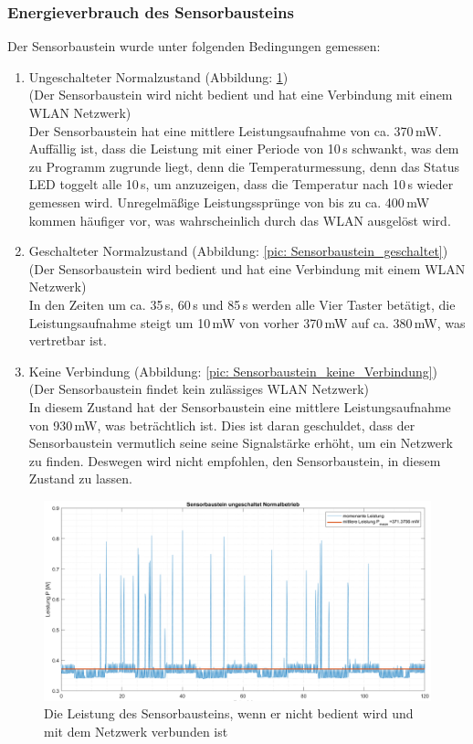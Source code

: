 \subsubsection{Energieverbrauch des Sensorbausteins}
Der Sensorbaustein wurde unter folgenden Bedingungen gemessen:
\begin{enumerate}
	\item Ungeschalteter Normalzustand (Abbildung: \ref{pic: Sensorbaustein_ungeschaltet}) \\(Der Sensorbaustein wird nicht bedient und hat eine Verbindung mit einem WLAN Netzwerk) \\
	Der Sensorbaustein hat eine mittlere Leistungsaufnahme von ca. 370\,mW. Auffällig ist, dass die Leistung mit einer Periode von 10\,s schwankt, was dem zu Programm zugrunde liegt, denn die Temperaturmessung, denn das Status LED toggelt alle 10\,s, um anzuzeigen, dass die Temperatur nach 10\,s wieder gemessen wird. Unregelmäßige Leistungssprünge von bis zu ca. 400\,mW kommen häufiger vor, was wahrscheinlich durch das WLAN ausgelöst wird.
	\\
	\item Geschalteter Normalzustand (Abbildung: \ref{pic: Sensorbaustein_geschaltet})\\ (Der Sensorbaustein wird bedient und hat eine Verbindung mit einem WLAN Netzwerk)\\
	In den Zeiten um ca. 35\,s, 60\,s und 85\,s werden alle Vier Taster betätigt, die Leistungsaufnahme steigt um 10\,mW von vorher 370\,mW auf ca. 380\,mW, was vertretbar ist.
	\\
	\item Keine Verbindung (Abbildung: \ref{pic: Sensorbaustein_keine_Verbindung})\\ (Der Sensorbaustein findet kein zulässiges WLAN Netzwerk)\\
	In diesem Zustand hat der Sensorbaustein eine mittlere Leistungsaufnahme von 930\,mW, was beträchtlich ist. Dies ist daran geschuldet, dass der Sensorbaustein vermutlich seine seine Signalstärke erhöht, um ein Netzwerk zu finden. Deswegen wird nicht empfohlen, den Sensorbaustein, in diesem Zustand zu lassen.
\end{enumerate}


\begin{figure}[H]
	\centering
	\includegraphics[width=1\textwidth]{graphics/Sensorbaustein_ungeschaltet.png}
	\caption{Die Leistung des Sensorbausteins, wenn er nicht bedient wird und mit dem Netzwerk verbunden ist}
	\label{pic: Sensorbaustein_ungeschaltet}
\end{figure}

